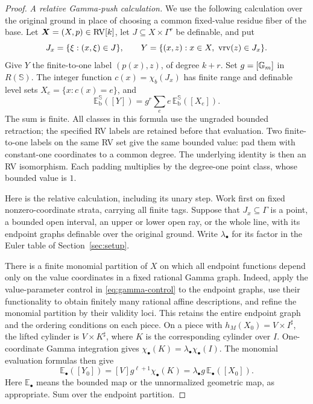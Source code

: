 \begin{proof}
\medskip
\noindent\emph{A relative Gamma-push calculation.}
We use the following calculation over the original ground
in place of choosing a common fixed-value residue fiber
of the base.
Let $\bm X=(X,p)\in\mathrm{RV}[k]$, let
$J\subseteq X\times\Gamma^r$ be definable, and put
\[
 J_x=\{\xi:(x,\xi)\in J\},\qquad
 Y=\{(x,z):x\in X,\ \operatorname{vrv}(z)\in J_x\}.
\]
Give $Y$ the finite-to-one label $(p(x),z)$, of degree
$k+r$. Set $g=[\mathbb G_m]$ in $R(\mathbb S)$.
The integer function $c(x)=\chi_b(J_x)$ has finite range
and definable level sets $X_e=\{x:c(x)=e\}$, and
\begin{equation}\label{relative:Gamma:push}
 \mathbb E_{\mathrm b}^{\mathbb S}([Y])
       =g^r\sum_e e\,
               \mathbb E_{\mathrm b}^{\mathbb S}([X_e]).
\end{equation}
The sum is finite. All classes in this formula use the
ungraded bounded retraction; the specified RV labels are
retained before that evaluation.
Two finite-to-one labels on the same RV set give the same
bounded value: pad them with constant-one coordinates to
a common degree. The underlying identity is then an RV
isomorphism. Each padding multiplies by the degree-one
point class, whose bounded value is $1$.

Here is the relative calculation, including its unary step.
Work first on fixed nonzero-coordinate strata, carrying all finite tags.
Suppose that $J_x\subseteq\Gamma$ is a point, a bounded open interval,
an upper or lower open ray, or the whole line, with its endpoint graphs
definable over the original ground. Write $\lambda_\bullet$ for its
factor in the Euler table of Section~\ref{sec:setup}.

There is a finite monomial partition of $X$ on which all endpoint
functions depend only on the value coordinates in a fixed rational
Gamma graph. Indeed, apply the value-parameter control in
\eqref{eq:gamma-control} to the endpoint graphs, use their functionality
to obtain finitely many rational affine descriptions, and refine the
monomial partition by their validity loci. This retains the entire
endpoint graph and the ordering conditions on each piece.
On a piece with $h_M(X_0)=V\times I^\sharp$, the lifted cylinder is
$V\times K^\sharp$, where $K$ is the corresponding cylinder over $I$.
One-coordinate Gamma integration gives
$\chi_\bullet(K)=\lambda_\bullet\chi_\bullet(I)$.
The monomial evaluation formulas then give
\[
 \mathbb E_\bullet([Y_0])
   =[V]g^{\ell+1}\chi_\bullet(K)
   =\lambda_\bullet g\,\mathbb E_\bullet([X_0]).
\]
Here $\mathbb E_\bullet$ means the bounded map or the unnormalized
geometric map, as appropriate. Sum over the endpoint partition.


\end{proof}
